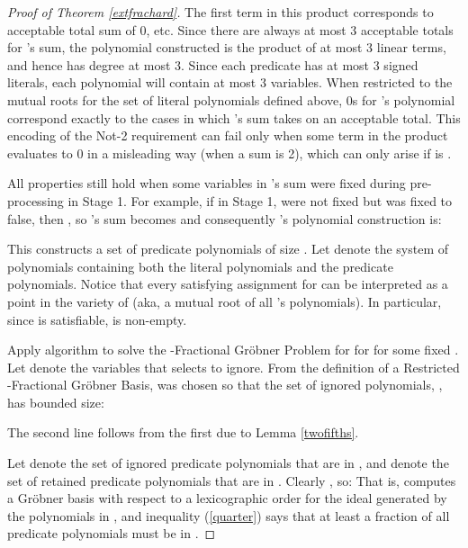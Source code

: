 \documentclass{article}
\begin{document}
\begin{proof}[Proof of Theorem \ref{extfrachard}]
The first term in this product corresponds to acceptable total sum of 0, etc.
Since there are always at most 3 acceptable totals for 's sum, the polynomial constructed is the product of at most 3 linear terms, and hence has degree at most 3. Since each predicate has at most 3 signed literals, each polynomial will contain at most 3 variables. When restricted to the mutual roots for the set of literal polynomials defined above, 0s for 's polynomial correspond exactly to the cases in which 's sum takes on an acceptable total. This encoding of the Not-2 requirement can fail only when some term in the product evaluates to 0 in a misleading way (when a sum is 2), which can only arise if  is .

All properties still hold when some variables in 's sum were fixed during pre-processing in Stage 1. For example, if in Stage 1,  were not fixed but  was fixed to false, then , so 's sum becomes  and consequently 's polynomial construction is:


This constructs a set of predicate polynomials of size . Let  denote the system of polynomials containing both the literal polynomials and the predicate polynomials. Notice that every satisfying assignment for  can be interpreted as a point in the variety of  (aka, a mutual root of all 's polynomials). In particular, since  is satisfiable,  is non-empty.

Apply algorithm  to solve the \nobreakdash-Fractional Gr\"{o}bner Problem for  for  for some fixed . Let  denote the variables that  selects to ignore. From the definition of a Restricted \nobreakdash-Fractional Gr\"{o}bner Basis,  was chosen so that the set of ignored polynomials, , has bounded size:

The second line follows from the first due to Lemma \ref{twofifths}. 

Let  denote the set of ignored predicate polynomials that are in , and  denote the set of retained predicate polynomials that are in . Clearly , so:
That is,  computes a Gr\"{o}bner basis with respect to a lexicographic order for the ideal generated by the polynomials in , and inequality (\ref{quarter}) says that at least a  fraction of all predicate polynomials must be in . 


\end{proof}
\end{document}
